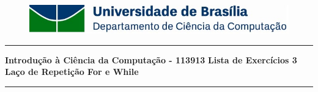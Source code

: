 \documentclass[a4paper, 12pt]{article}
\begin{document}
\begin{figure}[H]
	\includegraphics[scale=0.9]{UnB_CiC_Logo.jpg}
\end{figure}
\noindent\rule{\textwidth}{0.4pt}
\begin{center}
	\textbf{{\Large Introdução à Ciência da Computação - 113913}} \newline \newline
	\textbf{{\large Lista de Exercícios 3} \\
	\vspace{9pt}
	{\large Laço de Repetição For e While}} \\
	\noindent\rule{\textwidth}{0.4pt}
	\newline
\end{center}
\end{document}
